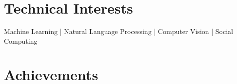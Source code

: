 \documentclass[a4paper,10pt]{extarticle} %
\begin{document}






\vspace{-0.3cm}
\section{\textcolor{primary}{Technical Interests}}

\noindent Machine Learning | Natural Language Processing | Computer Vision | Social Computing \\%



\vspace{-0.3cm}
\section{\textcolor{primary}{Achievements}}
\end{document}
